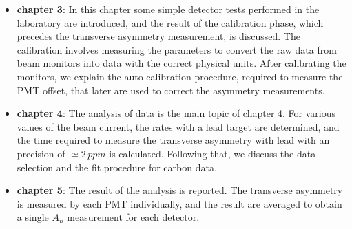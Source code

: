 \begin{itemize}
\item \textbf{chapter 3}: In this chapter some simple detector tests performed in the laboratory are introduced, and the result of the calibration phase, which precedes the transverse asymmetry measurement, is discussed. The calibration involves measuring the parameters to convert the raw data from beam monitors into data with the correct physical units. After calibrating the monitors, we explain the auto-calibration procedure, required to measure the PMT offset, that later are used to correct the asymmetry measurements.
\item \textbf{chapter 4}: The analysis of data is the main topic of chapter 4. For various values of the beam current, the rates with a lead target are determined, and the time required to measure the transverse asymmetry with lead with an precision of $\simeq 2 \, ppm$ is calculated. Following that, we discuss the data selection and the fit procedure for carbon data.
\item \textbf{chapter 5}: The result of the analysis is reported. The transverse asymmetry is measured by each PMT individually, and the result are averaged to obtain a single $A_{n}$ measurement for each detector.  
\end{itemize}